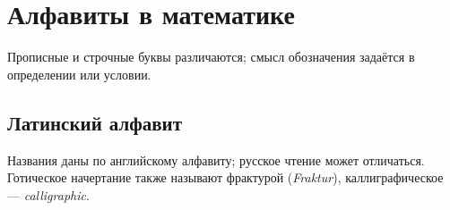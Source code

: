 \chapter*{Алфавиты в математике}

Прописные и строчные буквы различаются; смысл обозначения задаётся в определении или условии.

\begingroup\small\linespread{1}\selectfont\renewcommand{\arraystretch}{1.0}

\section*{Латинский алфавит}

Названия даны по английскому алфавиту; русское чтение может отличаться. Готическое начертание также называют фрактурой (\emph{Fraktur}), каллиграфическое --- \emph{calligraphic}.

